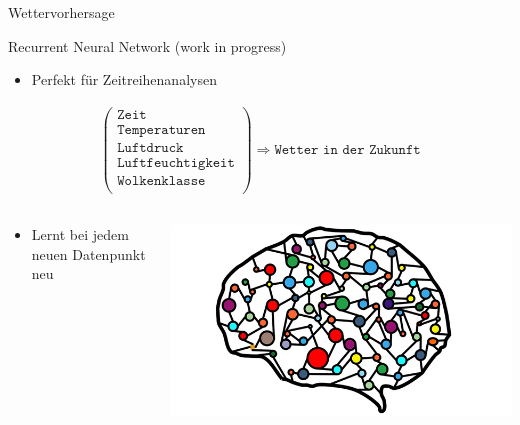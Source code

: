 \begin{frame}[t]{Wettervorhersage}
  \begin{block}{Recurrent Neural Network \tiny\alert{(work in progress)}}
    \begin{itemize}
      \item Perfekt für Zeitreihenanalysen
    \end{itemize}
    \begin{align*}
      \left(\begin{matrix}
          \texttt{Zeit} \\
          \texttt{Temperaturen} \\
          \texttt{Luftdruck} \\
          \texttt{Luftfeuchtigkeit} \\
          \texttt{Wolkenklasse} \\
      \end{matrix}\right)
      \Longrightarrow \texttt{Wetter in der Zukunft}
    \end{align*}
    \begin{columns}[onlytextwidth]
      \begin{column}{0.48\textwidth}
        \begin{itemize}
          \item Lernt bei jedem neuen Datenpunkt neu
        \end{itemize}
      \end{column}
      \begin{column}{0.48\textwidth}
        \centering
        \includegraphics[height=0.2\textheight]{picture/neuralnet_brain.png}
      \end{column}
    \end{columns}
  \end{block}
\end{frame}
